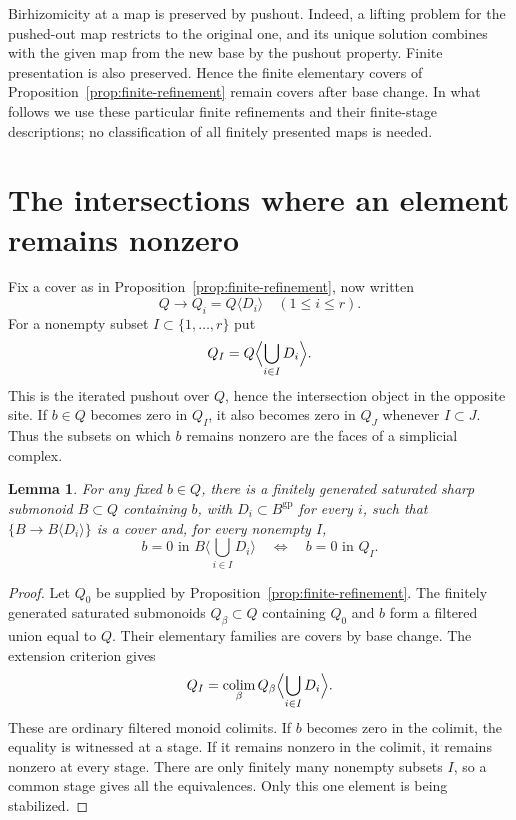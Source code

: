 \documentclass[11pt]{article}
\newtheorem{lemma}[theorem]{Lemma}
\theoremstyle{definition}
\theoremstyle{remark}
\newcommand{\gp}{\mathrm{gp}}
\newcommand{\colim}{\operatorname*{colim}}
\begin{document}
Birhizomicity at a map is preserved by pushout. Indeed, a lifting problem for the pushed-out map restricts to the original one, and its unique solution combines with the given map from the new base by the pushout property. Finite presentation is also preserved. Hence the finite elementary covers of Proposition~\ref{prop:finite-refinement} remain covers after base change. In what follows we use these particular finite refinements and their finite-stage descriptions; no classification of all finitely presented maps is needed.

\section{The intersections where an element remains nonzero}

Fix a cover as in Proposition~\ref{prop:finite-refinement}, now written
\[
 Q\longrightarrow Q_i=Q\langle D_i\rangle\quad(1\leq i\leq r).
\]
For a nonempty subset $I\subset\{1,\ldots,r\}$ put
\[
 Q_I=Q\Bigl\langle\bigcup_{i\in I}D_i\Bigr\rangle.
\]
This is the iterated pushout over $Q$, hence the intersection object in the opposite site. If $b\in Q$ becomes zero in $Q_I$, it also becomes zero in $Q_J$ whenever $I\subset J$. Thus the subsets on which $b$ remains nonzero are the faces of a simplicial complex.

\begin{lemma}\label{lem:stabilization}
For any fixed $b\in Q$, there is a finitely generated saturated sharp submonoid $B\subset Q$ containing $b$, with $D_i\subset B^{\gp}$ for every $i$, such that $\{B\to B\langle D_i\rangle\}$ is a cover and, for every nonempty $I$,
\[
 b=0\text{ in }B\langle\textstyle\bigcup_{i\in I}D_i\rangle
 \quad\Longleftrightarrow\quad b=0\text{ in }Q_I.
\]
\end{lemma}

\begin{proof}
Let $Q_0$ be supplied by Proposition~\ref{prop:finite-refinement}. The finitely generated saturated submonoids $Q_\beta\subset Q$ containing $Q_0$ and $b$ form a filtered union equal to $Q$. Their elementary families are covers by base change. The extension criterion gives
\[
 Q_I=\colim_\beta Q_\beta\Bigl\langle\bigcup_{i\in I}D_i\Bigr\rangle.
\]
These are ordinary filtered monoid colimits. If $b$ becomes zero in the colimit, the equality is witnessed at a stage. If it remains nonzero in the colimit, it remains nonzero at every stage. There are only finitely many nonempty subsets $I$, so a common stage gives all the equivalences. Only this one element is being stabilized.
\end{proof}
\end{document}
